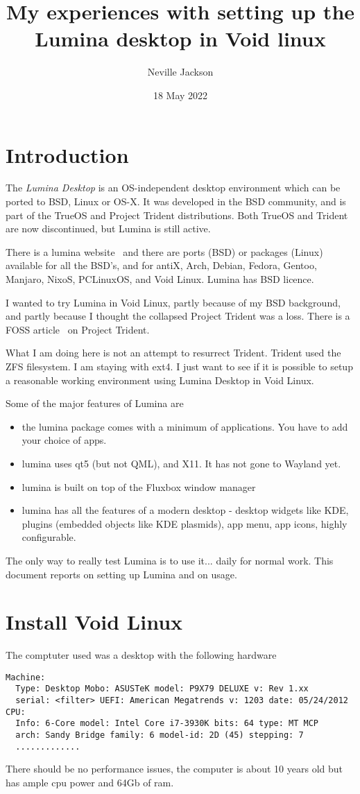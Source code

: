\documentclass{article}  %
\title{My experiences with setting up the Lumina desktop in Void linux}
\author{Neville Jackson}
\date{18 May 2022}
\begin{document}
 

\maketitle      

\section{Introduction} 
The {\em Lumina Desktop} is an OS-independent desktop environment which can be ported to BSD, Linux or OS-X. It was developed in the BSD community, and is part of the TrueOS and Project Trident distributions. Both TrueOS and Trident are now discontinued, but Lumina is still active. 

There is a lumina website~\cite{lumi:22} and there are ports (BSD) or packages (Linux) available for all the BSD's, and for antiX, Arch, Debian, Fedora, Gentoo, Manjaro, NixoS, PCLinuxOS, and Void Linux. Lumina has  BSD licence.

I wanted to try Lumina in Void Linux, partly because of my BSD background, and partly because I thought the collapsed Project Trident was a loss. There is a FOSS article~\cite{foss:21} on Project Trident. 

What I am doing here is not an attempt to resurrect Trident. Trident used the ZFS filesystem. I am staying with ext4. I just want to see if it is possible to setup a reasonable working environment using Lumina Desktop in Void Linux. 

Some of the major features of Lumina are
\begin{itemize}
\item the lumina package comes with a minimum of applications. You have to add your choice of apps.
\item lumina uses qt5 (but not QML), and X11. It has not gone to Wayland yet.
\item lumina is built on top of the Fluxbox window manager
\item lumina has all the features of a modern desktop - desktop widgets like KDE, plugins (embedded objects like KDE plasmids), app menu, app icons, highly configurable. 
\end{itemize}

The only way to really test Lumina is to use it... daily for normal work.  This document reports on setting up Lumina and on usage.

\section{Install Void Linux }
\label{sec:install}
The comptuter used  was a desktop with the following hardware 
\begin{verbatim}
Machine:
  Type: Desktop Mobo: ASUSTeK model: P9X79 DELUXE v: Rev 1.xx 
  serial: <filter> UEFI: American Megatrends v: 1203 date: 05/24/2012 
CPU:
  Info: 6-Core model: Intel Core i7-3930K bits: 64 type: MT MCP 
  arch: Sandy Bridge family: 6 model-id: 2D (45) stepping: 7 
  .............
\end{verbatim}
There should be no performance issues, the computer is about 10 years old but has ample cpu power and 64Gb of ram.
\end{document}

